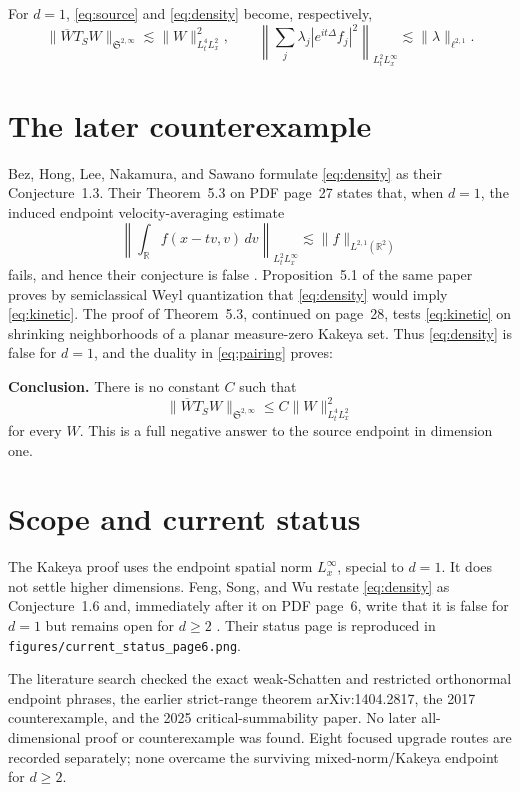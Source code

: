 \documentclass[11pt]{article}
\newcommand{\Sp}{\mathfrak S}
\newcommand{\R}{\mathbb R}
\begin{document}
For $d=1$, \eqref{eq:source} and \eqref{eq:density} become, respectively,
\[
 \|\overline W T_S W\|_{\Sp^{2,\infty}}
 \lesssim \|W\|_{L_t^4L_x^2}^2,
 \qquad
 \left\|\sum_j\lambda_j|e^{it\Delta}f_j|^2\right\|_{L_t^2L_x^\infty}
 \lesssim \|\lambda\|_{\ell^{2,1}}.
\]

\section{The later counterexample}

Bez, Hong, Lee, Nakamura, and Sawano formulate \eqref{eq:density} as their
Conjecture~1.3.  Their Theorem~5.3 on PDF page~27 states that, when $d=1$,
the induced endpoint velocity-averaging estimate
\begin{equation}\label{eq:kinetic}
 \left\|\int_{\R} f(x-tv,v)\,dv\right\|_{L_t^2L_x^\infty}
 \lesssim \|f\|_{L^{2,1}(\R^2)}
\end{equation}
fails, and hence their conjecture is false \cite{BHLNS17}.  Proposition~5.1
of the same paper proves by semiclassical Weyl quantization that
\eqref{eq:density} would imply \eqref{eq:kinetic}.  The proof of
Theorem~5.3, continued on page~28, tests \eqref{eq:kinetic} on shrinking
neighborhoods of a planar measure-zero Kakeya set.  Thus \eqref{eq:density}
is false for $d=1$, and the duality in \eqref{eq:pairing} proves:

\medskip
\noindent\textbf{Conclusion.}
There is no constant $C$ such that
\[
 \|\overline W T_S W\|_{\Sp^{2,\infty}}
 \le C\|W\|_{L_t^4L_x^2}^2
\]
for every $W$.  This is a full negative answer to the source endpoint in
dimension one.

\section{Scope and current status}

The Kakeya proof uses the endpoint spatial norm $L_x^\infty$, special to
$d=1$.  It does not settle higher dimensions.  Feng, Song, and Wu restate
\eqref{eq:density} as Conjecture~1.6 and, immediately after it on PDF page~6,
write that it is false for $d=1$ but remains open for $d\ge2$ \cite{FSW25}.
Their status page is reproduced in
\texttt{figures/current\_status\_page6.png}.

The literature search checked the exact weak-Schatten and restricted
orthonormal endpoint phrases, the earlier strict-range theorem
arXiv:1404.2817, the 2017 counterexample, and the 2025 critical-summability
paper.  No later all-dimensional proof or counterexample was found.  Eight
focused upgrade routes are recorded separately; none overcame the surviving
mixed-norm/Kakeya endpoint for $d\ge2$.
\end{document}
